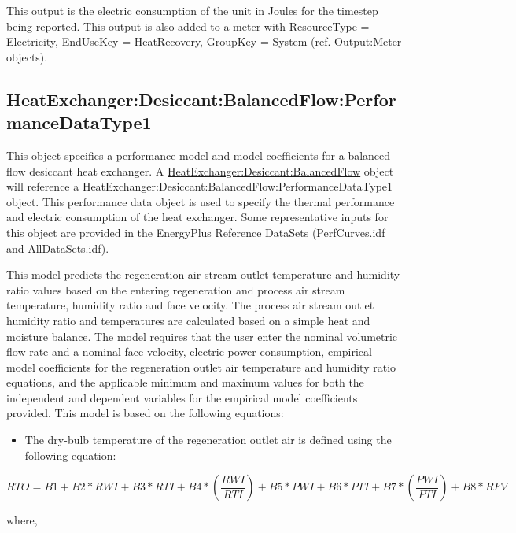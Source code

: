 This output is the electric consumption of the unit in Joules for the timestep being reported. This output is also added to a meter with ResourceType = Electricity, EndUseKey = HeatRecovery, GroupKey = System (ref. Output:Meter objects).

\subsection{HeatExchanger:Desiccant:BalancedFlow:PerformanceDataType1}\label{heatexchangerdesiccantbalancedflowperformancedatatype1}

This object specifies a performance model and model coefficients for a balanced flow desiccant heat exchanger. A \hyperref[heatexchangerdesiccantbalancedflow]{HeatExchanger:Desiccant:BalancedFlow} object will reference a HeatExchanger:Desiccant:BalancedFlow:PerformanceDataType1 object. This performance data object is used to specify the thermal performance and electric consumption of the heat exchanger. Some representative inputs for this object are provided in the EnergyPlus Reference DataSets (PerfCurves.idf and AllDataSets.idf).

This model predicts the regeneration air stream outlet temperature and humidity ratio values based on the entering regeneration and process air stream temperature, humidity ratio and face velocity. The process air stream outlet humidity ratio and temperatures are calculated based on a simple heat and moisture balance. The model requires that the user enter the nominal volumetric flow rate and a nominal face velocity, electric power consumption, empirical model coefficients for the regeneration outlet air temperature and humidity ratio equations, and the applicable minimum and maximum values for both the independent and dependent variables for the empirical model coefficients provided. This model is based on the following equations:

\begin{itemize}
\tightlist
\item
  The dry-bulb temperature of the regeneration outlet air is defined using the following equation:
\end{itemize}

\begin{equation}
RTO = B1 + B2*RWI + B3*RTI + B4*\left( {\frac{{RWI}}{{RTI}}} \right) + B5*PWI + B6*PTI + B7*\left( {\frac{{PWI}}{{PTI}}} \right) + B8*RFV
\end{equation}

where,

